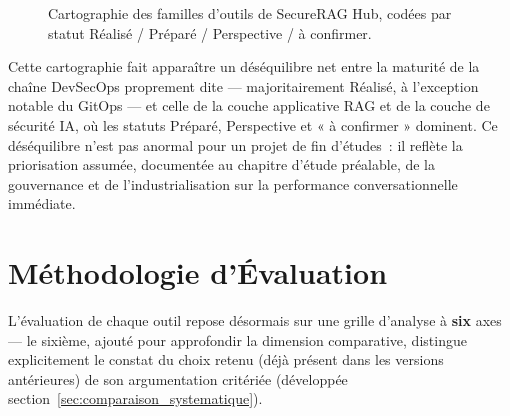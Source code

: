 \begin{figure}[htbp]
{
}
    \caption{Cartographie des familles d'outils de SecureRAG Hub, codées par statut Réalisé / Préparé / Perspective / à confirmer.}
    \label{fig:cartographie_statut}
\end{figure}

Cette cartographie fait apparaître un déséquilibre net entre la maturité de la chaîne DevSecOps proprement dite — majoritairement Réalisé, à l'exception notable du GitOps — et celle de la couche applicative RAG et de la couche de sécurité IA, où les statuts Préparé, Perspective et « à confirmer » dominent. Ce déséquilibre n'est pas anormal pour un projet de fin d'études~: il reflète la priorisation assumée, documentée au chapitre d'étude préalable, de la gouvernance et de l'industrialisation sur la performance conversationnelle immédiate.

\section{Méthodologie d'Évaluation}
\label{sec:methodologie}

L'évaluation de chaque outil repose désormais sur une grille d'analyse à \textbf{six} axes — le sixième, ajouté pour approfondir la dimension comparative, distingue explicitement le constat du choix retenu (déjà présent dans les versions antérieures) de son argumentation critériée (développée section~\ref{sec:comparaison_systematique}).

